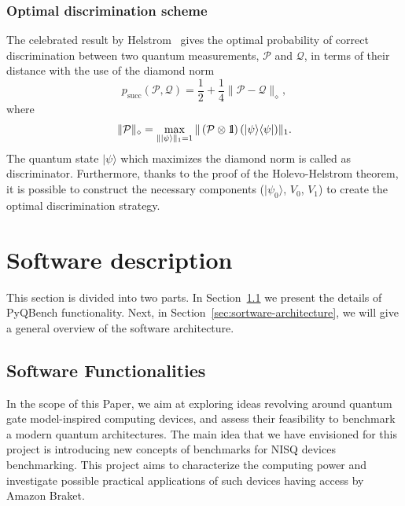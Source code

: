 \documentclass[preprint,12pt, a4paper, dvipsnames]{elsarticle}
\newcommand{\ket}[1]{\ensuremath{|#1\rangle}}
\newcommand{\bra}[1]{\ensuremath{\langle#1|}}
\newcommand{\ketbra}[2]{\ensuremath{\ket{#1}\bra{#2}}}
\newcommand{\proj}[1]{\ensuremath{\ketbra{#1}{#1}}}
\newcommand{\1}{{\rm 1\hspace{-0.9mm}l}}
\newcommand{\PP}{\mathcal{P}}
\begin{document}
\subsubsection{Optimal discrimination scheme}


The celebrated result by Helstrom~\cite{helstrom1976quantum} gives the optimal  probability of correct discrimination between two quantum measurements, $\PP$  and $\mathcal{Q}$,
in terms of their distance with the use of the diamond norm
\begin{equation}
p_{\text{succ}}(\PP, \mathcal{Q}) =  \frac12 + \frac14 \| \PP - \mathcal{Q} \|_\diamond,
\end{equation}
where
\begin{equation}
\|\PP\|_\diamond = \max_{\| \ket{\psi}\|_1=1} \| \left(\PP \otimes \1\right) (\proj{\psi}) \|_1.
\end{equation}
The quantum state $\ket{\psi}$ which maximizes the diamond norm is called as discriminator.
Furthermore,  thanks to the proof of the Holevo-Helstrom theorem, it is possible to construct the necessary components  ($\ket{\psi_0}$, $V_0$, $V_1$) to create the optimal discrimination strategy.



 \section{Software description}
 \label{}
 This section is divided into two parts.
 In Section~\ref{sec:sortware-functionalities} we present the details of PyQBench functionality. Next, in Section~\ref{sec:sortware-architecture},
 we will give a general overview of the software architecture.




\subsection{Software Functionalities}\label{sec:sortware-functionalities}


In the scope of this Paper, we aim at  exploring ideas revolving around quantum
gate model-inspired computing devices, and assess their feasibility to
benchmark a modern quantum architectures. The main idea that we have envisioned
for this project is  introducing new concepts of benchmarks for NISQ devices
benchmarking. This project aims to characterize the computing power and
investigate possible practical applications of such devices having access by
Amazon Braket.
\end{document}
